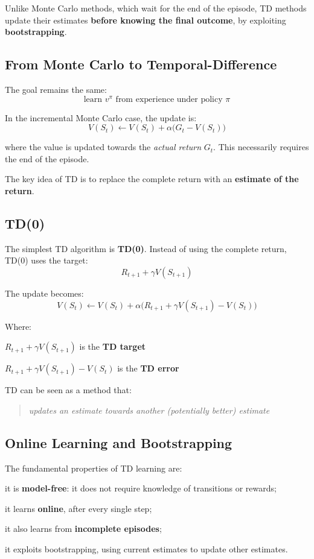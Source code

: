 Unlike Monte Carlo methods, which wait for the end of the episode,
TD methods update their estimates \textbf{before knowing the final outcome},
by exploiting \textbf{bootstrapping}.

\subsection{From Monte Carlo to Temporal-Difference}

The goal remains the same:
\[
\text{learn } v^\pi \text{ from experience under policy } \pi
\]

In the incremental Monte Carlo case, the update is:
\[
V(S_t) \leftarrow V(S_t) + \alpha \big( G_t - V(S_t) \big)
\]

where the value is updated towards the \textit{actual return} $G_t$.
This necessarily requires the end of the episode.

The key idea of TD is to replace the complete return with an \textbf{estimate of the return}.

\subsection{TD(0)}

The simplest TD algorithm is \textbf{TD(0)}.
Instead of using the complete return, TD(0) uses the target:
\[
R_{t+1} + \gamma V(S_{t+1})
\]

The update becomes:
\[
V(S_t) \leftarrow V(S_t)
+
\alpha \Big(
R_{t+1} + \gamma V(S_{t+1}) - V(S_t)
\Big)
\]

Where:
\begin{compactitemize}
    \item $R_{t+1} + \gamma V(S_{t+1})$ is the \textbf{TD target}
    \item $R_{t+1} + \gamma V(S_{t+1}) - V(S_t)$ is the \textbf{TD error}
\end{compactitemize}

TD can be seen as a method that:
\begin{quote}
\emph{updates an estimate towards another (potentially better) estimate}
\end{quote}

\subsection{Online Learning and Bootstrapping}

The fundamental properties of TD learning are:

\begin{compactitemize}
    \item it is \textbf{model-free}: it does not require knowledge of transitions or rewards;
    \item it learns \textbf{online}, after every single step;
    \item it also learns from \textbf{incomplete episodes};
    \item it exploits bootstrapping, using current estimates to update other estimates.
\end{compactitemize}

